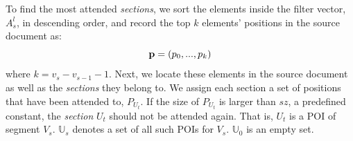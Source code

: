 To find the most attended \textit{sections}, 
we sort the elements inside the filter vector, 
$A_{s}^{l}$, in descending order, 
and record the top $k$ elements' positions in 
the source document as: 
\begin{equation}
\small
    \mathbf{p}=(p_{0},...,p_{k})
\end{equation}
where $k=v_{s}-v_{s-1}-1$.
Next, we locate these elements in the source document as well as
the \textit{sections} they belong to. 
We assign each section a set of positions that have been attended to, 
$P_{U_{t}}$. 
If the size of $P_{U_{t}}$ is larger than
$sz$, a predefined constant,
the \textit{section} $U_{t}$ should not be attended again. 
That is, $U_{t}$ is a POI of segment $V_{s}$.
$\mathbb{U}_{s}$ denotes a set of all such POIs for $V_s$.
$\mathbb{U}_{0}$ is an empty set.

